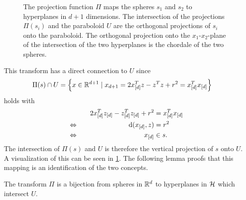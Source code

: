 \begin{figure}[tb]
    \caption{The projection function $\Pi$ maps the spheres $s_1$ and $s_2$ to hyperplanes in $d+1$ dimensions.
    The intersection of the projections $\Pi(s_i)$ and the paraboloid $U$ are the orthogonal projections of $s_i$ onto the paraboloid.
    The orthogonal projection onto the $x_1$-$x_2$-plane of the intersection of the two hyperplanes is the chordale of the two spheres.}
    \label{fig:projection}
\end{figure}
This transform has a direct connection to $U$ since
\begin{align}
    \Pi(s) \cap U &= \left\{ x \in \mathbb{R}^{d+1} \mid x_{d+1} = 2x_{[d]}^Tz - z^Tz + r^2 = x_{[d]}^Tx_{[d]} \right\}
\end{align}
holds with
\begin{alignat}{2}
    &&2x_{[d]}^Tz_{[d]} - z_{[d]}^Tz_{[d]} + r^2 &= x_{[d]}^Tx_{[d]}\\
    &\Leftrightarrow\quad& \operatorname{d}(x_{[d]}, z) &= r^2\\
    &\Leftrightarrow\quad& x_{[d]} &\in s.
\end{alignat}
The intersection of $\Pi(s)$ and $U$ is therefore the vertical projection of $s$ onto $U$.
A visualization of this can be seen in \cref{fig:projection}.
The following lemma proofs that this mapping is an identification of the two concepts.
\begin{lemma}
    \label{lem:pibijection}
    The transform $\Pi$ is a bijection from spheres in $\mathbb{R}^d$ to hyperplanes in $\mathcal{H}$ which intersect $U$.
\end{lemma}
